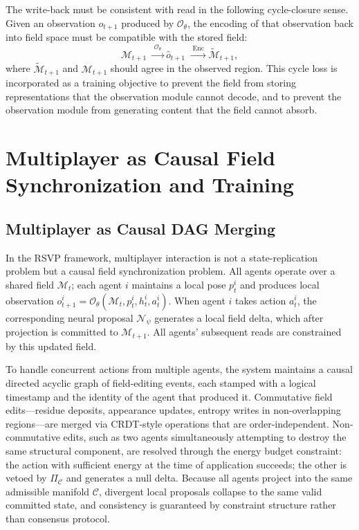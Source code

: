 \documentclass[11pt]{article}
\begin{document}
The write-back must be consistent with read in the following cycle-closure
sense.
Given an observation $o_{t+1}$ produced by $\mathcal{O}_\theta$, the
encoding of that observation back into field space must be compatible with
the stored field:
\[
\mathcal{M}_{t+1}
\;\xrightarrow{\;\mathcal{O}_\theta\;}
\hat{o}_{t+1}
\;\xrightarrow{\;\mathrm{Enc}\;}
\widetilde{\mathcal{M}}_{t+1},
\]
where $\widetilde{\mathcal{M}}_{t+1}$ and $\mathcal{M}_{t+1}$ should
agree in the observed region.
This cycle loss is incorporated as a training objective to prevent the
field from storing representations that the observation module cannot
decode, and to prevent the observation module from generating content
that the field cannot absorb.

\section{Multiplayer as Causal Field Synchronization and Training}
\label{sec:multiplayer}

\subsection{Multiplayer as Causal DAG Merging}

In the RSVP framework, multiplayer interaction is not a state-replication
problem but a causal field synchronization problem.
All agents operate over a shared field $\mathcal{M}_t$; each agent $i$
maintains a local pose $p_t^i$ and produces local observation
$o_{t+1}^i = \mathcal{O}_\theta(\mathcal{M}_t, p_t^i, h_t^i, a_t^i)$.
When agent $i$ takes action $a_t^i$, the corresponding neural proposal
$\mathcal{N}_\psi$ generates a local field delta, which after projection
is committed to $\mathcal{M}_{t+1}$.
All agents' subsequent reads are constrained by this updated field.

To handle concurrent actions from multiple agents, the system maintains a
causal directed acyclic graph of field-editing events, each stamped with
a logical timestamp and the identity of the agent that produced it.
Commutative field edits---residue deposits, appearance updates, entropy
writes in non-overlapping regions---are merged via CRDT-style operations
that are order-independent.
Non-commutative edits, such as two agents simultaneously attempting to
destroy the same structural component, are resolved through the energy
budget constraint: the action with sufficient energy at the time of
application succeeds; the other is vetoed by $\Pi_{\mathcal{C}}$ and
generates a null delta.
Because all agents project into the same admissible manifold $\mathcal{C}$,
divergent local proposals collapse to the same valid committed state,
and consistency is guaranteed by constraint structure rather than
consensus protocol.
\end{document}
